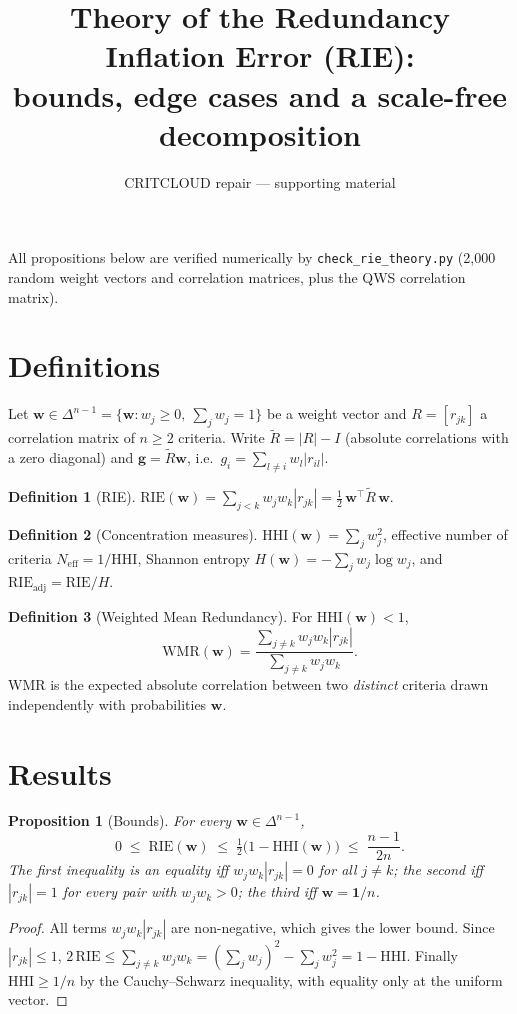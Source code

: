 \documentclass[11pt]{article}
\title{Theory of the Redundancy Inflation Error (RIE):\\ bounds, edge cases and a scale-free decomposition}
\author{CRITCLOUD repair --- supporting material}
\date{}
\newtheorem{proposition}{Proposition}
\theoremstyle{definition}
\newtheorem{definition}{Definition}
\theoremstyle{remark}
\begin{document}
\maketitle

\noindent All propositions below are verified numerically by \texttt{check\_rie\_theory.py}
(2{,}000 random weight vectors and correlation matrices, plus the QWS correlation matrix).

\section{Definitions}

Let $\mathbf{w}\in\Delta^{n-1}=\{\mathbf{w}:w_j\ge 0,\ \sum_j w_j=1\}$ be a weight vector and
$R=[r_{jk}]$ a correlation matrix of $n\ge 2$ criteria. Write $\tilde R=|R|-I$
(absolute correlations with a zero diagonal) and $\mathbf{g}=\tilde R\mathbf{w}$, i.e.\
$g_i=\sum_{l\ne i}w_l|r_{il}|$.

\begin{definition}[RIE]
$\displaystyle \mathrm{RIE}(\mathbf{w})=\sum_{j<k}w_jw_k|r_{jk}|=\tfrac12\,\mathbf{w}^{\top}\tilde R\,\mathbf{w}.$
\end{definition}

\begin{definition}[Concentration measures]
$\mathrm{HHI}(\mathbf{w})=\sum_j w_j^2$, effective number of criteria $N_{\mathrm{eff}}=1/\mathrm{HHI}$,
Shannon entropy $H(\mathbf{w})=-\sum_j w_j\log w_j$, and $\mathrm{RIE}_{\mathrm{adj}}=\mathrm{RIE}/H$.
\end{definition}

\begin{definition}[Weighted Mean Redundancy]
For $\mathrm{HHI}(\mathbf{w})<1$,
\[
\mathrm{WMR}(\mathbf{w})=\frac{\sum_{j\ne k}w_jw_k|r_{jk}|}{\sum_{j\ne k}w_jw_k}.
\]
WMR is the expected absolute correlation between two \emph{distinct} criteria drawn independently
with probabilities $\mathbf{w}$.
\end{definition}

\section{Results}

\begin{proposition}[Bounds]\label{p:bounds}
For every $\mathbf{w}\in\Delta^{n-1}$,
\[
0\;\le\;\mathrm{RIE}(\mathbf{w})\;\le\;\tfrac12\bigl(1-\mathrm{HHI}(\mathbf{w})\bigr)\;\le\;\frac{n-1}{2n}.
\]
The first inequality is an equality iff $w_jw_k|r_{jk}|=0$ for all $j\ne k$; the second iff
$|r_{jk}|=1$ for every pair with $w_jw_k>0$; the third iff $\mathbf{w}=\mathbf{1}/n$.
\end{proposition}
\begin{proof}
All terms $w_jw_k|r_{jk}|$ are non-negative, which gives the lower bound. Since $|r_{jk}|\le1$,
$2\,\mathrm{RIE}\le\sum_{j\ne k}w_jw_k=(\sum_j w_j)^2-\sum_j w_j^2=1-\mathrm{HHI}$. Finally
$\mathrm{HHI}\ge 1/n$ by the Cauchy--Schwarz inequality, with equality only at the uniform vector.
\end{proof}
\end{document}
